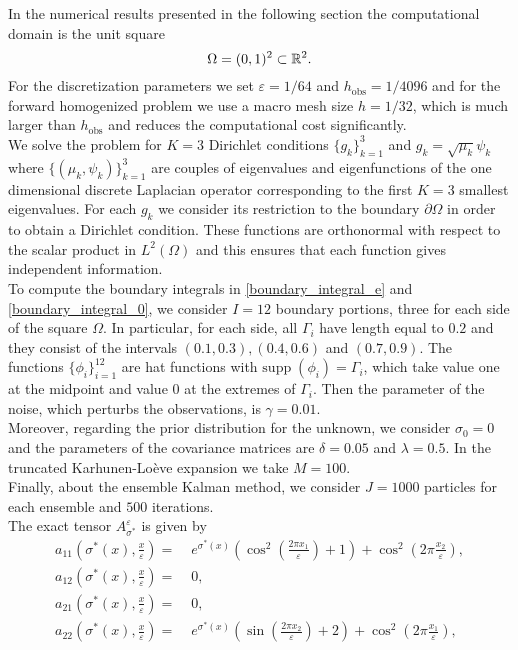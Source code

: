 In the numerical results presented in the following section the computational domain is the unit square
\[ \Omega = (0,1)^2 \subset \mathbb{R}^2. \]
For the discretization parameters we set $\varepsilon = 1/64$ and $h_{\mathrm{obs}} = 1/4096$ and for the forward homogenized problem we use a macro mesh size $h = 1/32$, which is much larger than $h_{\mathrm{obs}}$ and reduces the computational cost significantly. \\
We solve the problem for $K = 3$ Dirichlet conditions $\{ g_k \}_{k=1}^3$ and $g_k = \sqrt{\mu_k} \psi_k$ where $\{ (\mu_k, \psi_k) \}_{k=1}^3$ are couples of eigenvalues and eigenfunctions of the one dimensional discrete Laplacian operator corresponding to the first $K = 3$ smallest eigenvalues. For each $g_k$ we consider its restriction to the boundary $\partial \Omega$ in order to obtain a Dirichlet condition. These functions are orthonormal with respect to the scalar product in $L^2(\Omega)$ and this ensures that each function gives independent information. \\
To compute the boundary integrals in \eqref{boundary_integral_e} and \eqref{boundary_integral_0}, we consider $I = 12$ boundary portions, three for each side of the square $\Omega$. In particular, for each side, all $\Gamma_i$ have length equal to $0.2$ and they consist of the intervals $(0.1,0.3), (0.4,0.6)$ and $(0.7,0.9)$. The functions $\{ \phi_i \}_{i=1}^{12}$ are hat functions with $\mathrm{supp} \; (\phi_i) = \Gamma_i$, which take value one at the midpoint and value $0$ at the extremes of $\Gamma_i$. Then the parameter of the noise, which perturbs the observations, is $\gamma = 0.01$. \\
Moreover, regarding the prior distribution for the unknown, we consider $\sigma_0 = 0$ and the parameters of the covariance matrices are $\delta = 0.05$ and $\lambda = 0.5$. In the truncated Karhunen-Lo\`eve expansion we take $M = 100$. \\
Finally, about the ensemble Kalman method, we consider $J = 1000$ particles for each ensemble and $500$ iterations. \\
The exact tensor $A_{\sigma^*}^{\varepsilon}$ is given by
\begin{align*}
a_{11} \left ( \sigma^*(x), \frac{x}{\varepsilon} \right ) = & \; e^{\sigma^*(x)} \left ( \cos^2 \left ( \frac{2 \pi x_1}{\varepsilon} \right ) + 1 \right ) + \cos^2 \left ( 2 \pi \frac{x_2}{\varepsilon} \right ), \\
a_{12} \left ( \sigma^*(x), \frac{x}{\varepsilon} \right ) = & \; 0, \\
a_{21} \left ( \sigma^*(x), \frac{x}{\varepsilon} \right ) = & \; 0, \\
a_{22} \left ( \sigma^*(x), \frac{x}{\varepsilon} \right ) = & \; e^{\sigma^*(x)} \left ( \sin \left ( \frac{2 \pi x_2}{\varepsilon} \right ) + 2 \right ) + \cos^2 \left ( 2 \pi \frac{x_1}{\varepsilon} \right ),
\end{align*}
